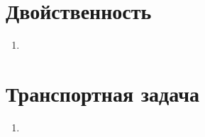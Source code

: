 \documentclass[12pt]{article}
\begin{document}
\section*{Двойственность}

\begin{enumerate}
  \item 
\end{enumerate}

\section*{Транспортная задача}

\begin{enumerate}
  \item 
\end{enumerate}
\end{document}
